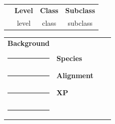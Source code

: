 \documentclass[10pt]{article}
\begin{document}
\begin{tcolorbox}[colback=white,title=CHARACTER,boxrule=1pt]
\begin{tabularx}{\textwidth}{>{\raggedright\arraybackslash}X c c c}
{\LARGE\bfseries {{ name }}} & \textbf{Level} & \textbf{Class} & \textbf{Subclass} \\
& {{ level }} & {{ class }} & {{ subclass }} \\
\end{tabularx}

\vspace{3pt}
\begin{tabularx}{\textwidth}{>{\raggedright\arraybackslash}X >{\raggedright\arraybackslash}X >{\raggedright\arraybackslash}X >{\raggedright\arraybackslash}X}
\textbf{Background}\\ \rule{0.95\linewidth}{0.4pt} &
\textbf{Species}\\ \rule{0.95\linewidth}{0.4pt} &
\textbf{Alignment}\\ \rule{0.95\linewidth}{0.4pt} &
\textbf{XP}\\ \rule{0.95\linewidth}{0.4pt}
\end{tabularx}
\end{tcolorbox}

\vspace{4pt}
\end{document}
